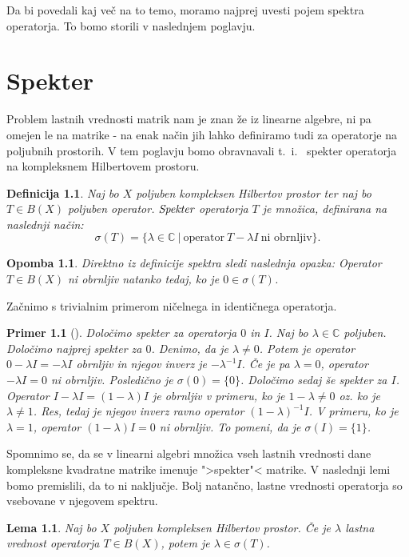 \documentclass[12pt,a4paper,oneside,fleqn,openany]{book}
\newtheorem{lema}[izrek]{Lema}
\newtheorem{definicija}[izrek]{Definicija}
\newtheorem{opomba}[izrek]{Opomba}
\newtheorem{primer*}[izrek]{Primer}
\newenvironment{primer}[1][]{\begin{primer*}[#1]\renewcommand*{\qedsymbol}{$\diamondsuit$}\pushQED{\qed}}{\popQED\end{primer*}}
\newcommand{\C}{\mathbb{C}}
\newcommand{\pojem}[1]{\ensuremath{\emph{#1}}}
\begin{document}
Da bi povedali kaj več na to temo, moramo najprej uvesti pojem spektra operatorja. To bomo storili v naslednjem poglavju.

\chapter{Spekter}
Problem lastnih vrednosti matrik nam je znan že iz linearne algebre, ni pa omejen le na matrike - na enak način jih lahko definiramo tudi za operatorje na poljubnih prostorih. V tem poglavju bomo obravnavali t.~i.~ spekter operatorja na kompleksnem Hilbertovem prostoru.

\begin{definicija}
	\label{def:specter}
	Naj bo $X$ poljuben kompleksen Hilbertov prostor ter naj bo $T\in B(X)$ poljuben operator. \pojem{Spekter} operatorja $T$ je množica, definirana na naslednji način: $$\sigma(T) = \{\lambda\in\C~|~\text{operator}~T-\lambda I~\text{ni obrnljiv}\}.$$
\end{definicija}

\begin{opomba}
	\label{opomb:specter}
	Direktno iz definicije spektra sledi naslednja opazka: Operator $T\in B(X)$ ni obrnljiv natanko tedaj, ko je $0\in\sigma(T)$.
\end{opomba}
Začnimo s trivialnim primerom ničelnega in identičnega operatorja.
\begin{primer}
	\label{prim:trivspec}
	Določimo spekter za operatorja $0$ in $I$. Naj bo $\lambda\in\C$ poljuben. Določimo najprej spekter za $0$. Denimo, da je $\lambda\neq 0$. Potem je operator $0-\lambda I = -\lambda I$ obrnljiv in njegov inverz je $-\lambda^{-1}I$. Če je pa $\lambda = 0$, operator $-\lambda I = 0$ ni obrnljiv. Posledično je $\sigma(0)=\{0\}$. 
	Določimo sedaj še spekter za $I$. Operator $I - \lambda I = (1-\lambda)I$ je obrnljiv v primeru, ko je $1-\lambda \neq 0$ oz. ko je $\lambda \neq 1$. Res, tedaj je njegov inverz ravno operator $(1-\lambda)^{-1}I$. V primeru, ko je $\lambda=1$, operator $(1-\lambda)I = 0$ ni obrnljiv. To pomeni, da je $\sigma(I) = \{1\}$.
\end{primer}

Spomnimo se, da se v linearni algebri množica vseh lastnih vrednosti dane kompleksne kvadratne matrike imenuje ">spekter"< matrike. V naslednji lemi bomo premislili, da to ni naključje. Bolj natančno, lastne vrednosti operatorja so vsebovane v njegovem spektru.

\begin{lema}
	\label{lem:eigeninspecter}
	Naj bo $X$ poljuben kompleksen Hilbertov prostor. Če je $\lambda$ lastna vrednost operatorja $T\in B(X)$, potem je $\lambda\in\sigma(T)$.
\end{lema}
\end{document}
